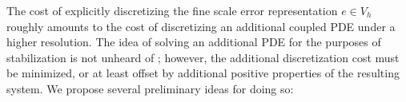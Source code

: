 \documentclass[final,leqno]{siamltex}
\newcommand{\bs}[1]{\boldsymbol{#1}}
\newcommand{\LRp}[1]{\left( #1 \right)}
\begin{document}
The cost of explicitly discretizing the fine scale error representation $e\in V_h$ roughly amounts to the cost of discretizing an additional coupled PDE under a higher resolution.   The idea of solving an additional PDE for the purposes of stabilization is not unheard of \cite{Barter}; however, the additional discretization cost must be minimized, or at least offset by additional positive properties of the resulting system.  We propose several preliminary ideas for doing so: 
\begin{itemize}


\end{itemize}
\end{document}
